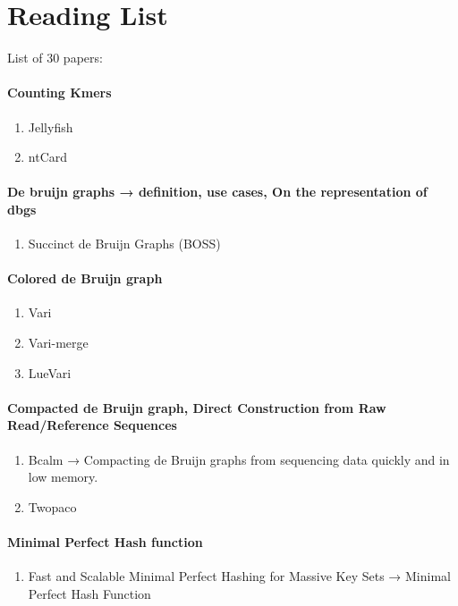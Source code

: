 
\chapter{Reading List}
\label{chap:readingList}

List of 30 papers:
\subsubsection{Counting Kmers}
\begin{enumerate}
    \item Jellyfish
    \item ntCard
\end{enumerate}
\subsubsection{De bruijn graphs → definition, use cases, On the representation of dbgs}
\begin{enumerate}
    \item Succinct de Bruijn Graphs (BOSS)
\end{enumerate}
\subsubsection{Colored de Bruijn graph}
\begin{enumerate}
    \item Vari
    \item Vari-merge
    \item LueVari
\end{enumerate}
\subsubsection{Compacted de Bruijn graph, Direct Construction from Raw Read/Reference Sequences}
\begin{enumerate}
    \item Bcalm → Compacting de Bruijn graphs from sequencing data quickly and in low memory.
    \item Twopaco
\end{enumerate}
\subsubsection{Minimal Perfect Hash function}
\begin{enumerate}
    \item Fast and Scalable Minimal Perfect Hashing for Massive Key Sets → Minimal Perfect Hash Function
\end{enumerate}
